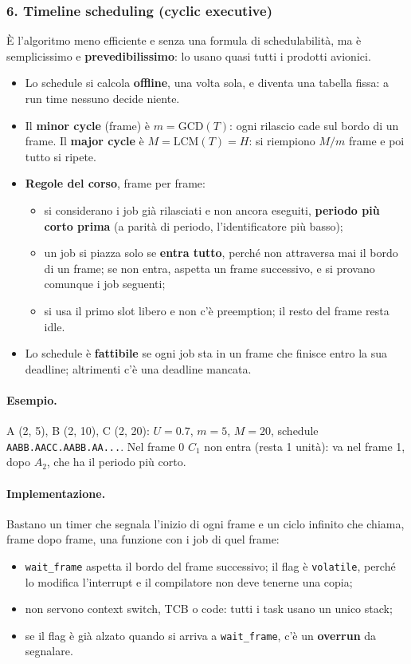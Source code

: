 \subsubsection*{6. Timeline scheduling (cyclic executive)}
È l'algoritmo meno efficiente e senza una formula di schedulabilità, ma è semplicissimo e \textbf{prevedibilissimo}: lo usano quasi tutti i prodotti avionici.
\begin{itemize}
    \item Lo schedule si calcola \textbf{offline}, una volta sola, e diventa una tabella fissa: a run time nessuno decide niente.
    \item Il \textbf{minor cycle} (frame) è $m = \mathrm{GCD}(T)$: ogni rilascio cade sul bordo di un frame. Il \textbf{major cycle} è $M = \mathrm{LCM}(T) = H$: si riempiono $M/m$ frame e poi tutto si ripete.
    \item \textbf{Regole del corso}, frame per frame:
    \begin{itemize}
        \item si considerano i job già rilasciati e non ancora eseguiti, \textbf{periodo più corto prima} (a parità di periodo, l'identificatore più basso);
        \item un job si piazza solo se \textbf{entra tutto}, perché non attraversa mai il bordo di un frame; se non entra, aspetta un frame successivo, e si provano comunque i job seguenti;
        \item si usa il primo slot libero e non c'è preemption; il resto del frame resta idle.
    \end{itemize}
    \item Lo schedule è \textbf{fattibile} se ogni job sta in un frame che finisce entro la sua deadline; altrimenti c'è una deadline mancata.
\end{itemize}

\paragraph*{Esempio.} A (2, 5), B (2, 10), C (2, 20): $U = 0.7$, $m = 5$, $M = 20$, schedule \texttt{AABB.AACC.AABB.AA...}. Nel frame 0 $C_1$ non entra (resta 1 unità): va nel frame 1, dopo $A_2$, che ha il periodo più corto.

\paragraph*{Implementazione.} Bastano un timer che segnala l'inizio di ogni frame e un ciclo infinito che chiama, frame dopo frame, una funzione con i job di quel frame:
\begin{itemize}
    \item \texttt{wait\_frame} aspetta il bordo del frame successivo; il flag è \texttt{volatile}, perché lo modifica l'interrupt e il compilatore non deve tenerne una copia;
    \item non servono context switch, TCB o code: tutti i task usano un unico stack;
    \item se il flag è già alzato quando si arriva a \texttt{wait\_frame}, c'è un \textbf{overrun} da segnalare.
\end{itemize}

